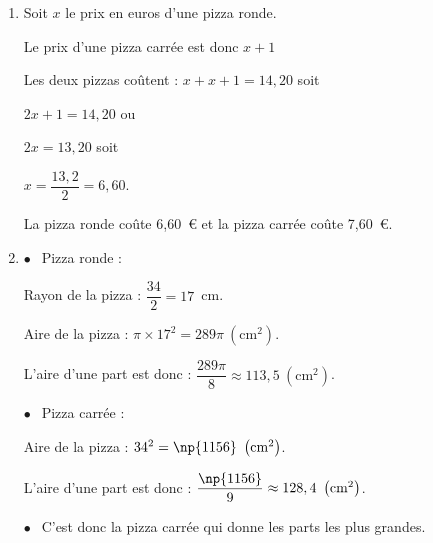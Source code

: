 
\medskip

\begin{enumerate}
\item Soit $x$ le prix en euros d'une pizza ronde.

Le prix d'une pizza carrée est donc $x + 1$ 

Les deux pizzas coûtent : $x + x + 1 = 14,20$ soit 

$2x + 1 = 14,20$ ou 

$2x = 13,20$ soit 

$x = \dfrac{13,2}{2}  = 6,60$.

La pizza ronde coûte 6,60~\euro{} et la pizza carrée coûte 7,60~\euro.
\item $\bullet~~$ Pizza ronde :

Rayon de la pizza : $\dfrac{34}{2} = 17$~cm.

Aire de la pizza : $\pi \times 17^2 = 289\pi~\left(\text{cm}^2\right)$.

L'aire d'une part est donc :  $\dfrac{289\pi}{8} \approx  113,5~\left(\text{cm}^2\right)$.

$\bullet~~$ Pizza carrée :

Aire  de la pizza : $34^2 = \np{1156}~\left(\text{cm}^2\right)$.

L'aire d'une part est donc : $\dfrac{\np{1156}}{9} \approx  128,4~\left(\text{cm}^2\right)$.

$\bullet~~$ C'est donc  la pizza carrée qui donne  les parts les plus grandes.
\end{enumerate}
